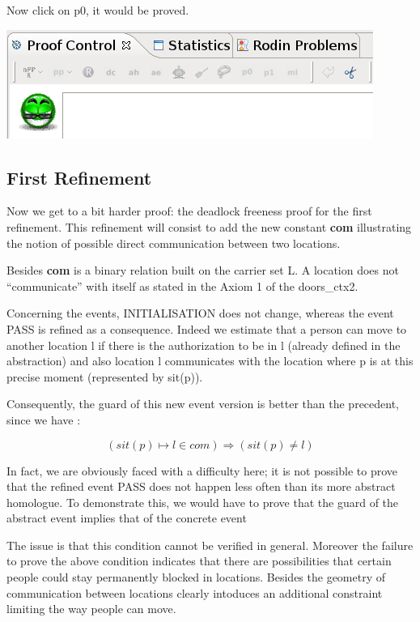 Now click on p0, it would be proved.

\begin{center}
	\includegraphics[]{img/tutorial/tut_10_proved.png}
\end{center}

\subsection{First Refinement}

Now we get to a bit harder proof: the deadlock freeness proof for the first refinement. This refinement will consist to add the new constant \textbf{com} illustrating the notion of possible direct communication between two locations.

Besides \textbf{com} is a binary relation built on the carrier set L. A location does not “communicate” with itself as stated in the Axiom 1 of the doors\_ctx2.

Concerning the events, \textsf{INITIALISATION} does not change, whereas the event \textsf{PASS} is refined as a consequence. Indeed we estimate that a person can move to another location l if there is the authorization to be in l (already defined in the abstraction) and also location l communicates with the location where p is at this precise moment (represented by sit(p)).

Consequently, the guard of this new event version is better than the precedent, since we have :

\[
( sit(p) \mapsto l \in com ) \Rightarrow ( sit(p)\neq l )
\]

In fact, we are obviously faced with a difficulty here; it is not possible to prove that the refined event \textsf{PASS} does not happen less often than its more abstract homologue. To demonstrate this, we would have to prove that the guard of the abstract event implies that of the concrete event

The issue is that this condition cannot be verified in general. Moreover the failure to prove the above condition indicates that there are possibilities that certain people could stay permanently blocked in locations. Besides the geometry of communication between locations clearly intoduces an additional constraint limiting the way people can move.

